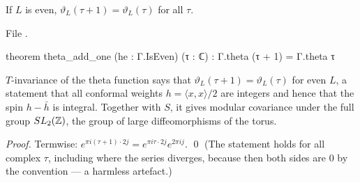 \begin{theorem}[$T$-invariance]\label{ch02:thm:thetaT}
If $L$ is even, $\vartheta_L(\tau+1)=\vartheta_L(\tau)$ for all $\tau$.
\end{theorem}
\noindent File .
\begin{leancode}
theorem theta_add_one (he : Γ.IsEven) (τ : ℂ) : Γ.theta (τ + 1) = Γ.theta τ
\end{leancode}
\begin{physics}
$T$-invariance of the theta function says that $\vartheta_L(\tau+1)=\vartheta_L(\tau)$ for even $L$, a statement that all conformal weights $h=\langle x,x\rangle/2$ are integers and hence that the spin $h-\bar h$ is integral. Together with $S$, it gives modular covariance under the full group $SL_2({\mathbb{Z}})$, the group of large diffeomorphisms of the torus.
\end{physics}
\emph{Proof.}  Termwise: $e^{\pi i(\tau+1)\cdot2j}=e^{\pi i\tau\cdot 2j}e^{2\pi ij}$. \qed
(The statement holds for all complex $\tau$, including where the series diverges, because then
both sides are $0$ by the  convention --- a harmless artefact.)

